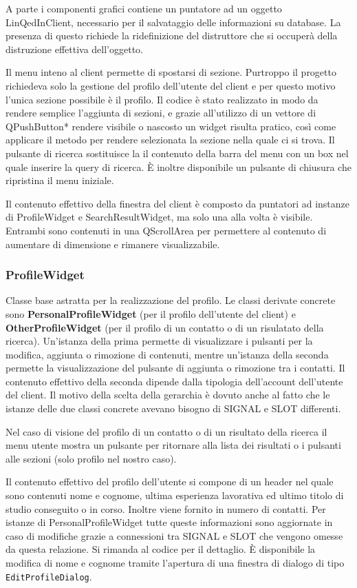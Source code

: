 \documentclass[a4paper,10pt]{article}
\begin{document}
A parte i componenti grafici contiene un puntatore ad un oggetto LinQedInClient, necessario per il salvataggio delle informazioni su database. La presenza di questo richiede la ridefinizione del distruttore che si occuperà della distruzione effettiva dell'oggetto.

Il menu inteno al client permette di spostarsi di sezione. Purtroppo il progetto richiedeva solo la gestione del profilo dell'utente del client e per questo motivo l'unica sezione possibile è il profilo. Il codice è stato realizzato in modo da rendere semplice l'aggiunta di sezioni, e grazie all'utilizzo di un vettore di QPushButton* rendere visibile o nascosto un widget risulta pratico, così come applicare il metodo per rendere selezionata la sezione nella quale ci si trova. Il pulsante di ricerca sostituisce la il contenuto della barra del menu con un box nel quale inserire la query di ricerca. È inoltre disponibile un pulsante di chiusura che ripristina il menu iniziale.

Il contenuto effettivo della finestra del client è composto da puntatori ad instanze di ProfileWidget e SearchResultWidget, ma solo una alla volta è visibile. Entrambi sono contenuti in una QScrollArea per permettere al contenuto di aumentare di dimensione e rimanere visualizzabile.

\subsubsection*{ProfileWidget}
Classe base astratta per la realizzazione del profilo. Le classi derivate concrete sono \textbf{PersonalProfileWidget} (per il profilo dell'utente del client) e \textbf{OtherProfileWidget} (per il profilo di un contatto o di un risulatato della ricerca). Un'istanza della prima permette di visualizzare i pulsanti per la modifica, aggiunta o rimozione di contenuti, mentre un'istanza della seconda permette la visualizzazione del pulsante di aggiunta o rimozione tra i contatti. Il contenuto effettivo della seconda dipende dalla tipologia dell'account dell'utente del client. Il motivo della scelta della gerarchia è dovuto anche al fatto che le istanze delle due classi concrete avevano bisogno di SIGNAL e SLOT differenti.

Nel caso di visione del profilo di un contatto o di un risultato della ricerca il menu utente mostra un pulsante per ritornare alla lista dei risultati o i pulsanti alle sezioni (solo profilo nel nostro caso).

Il contenuto effettivo del profilo dell'utente si compone di un header nel quale sono contenuti nome e cognome, ultima esperienza lavorativa ed ultimo titolo di studio conseguito o in corso. Inoltre viene fornito in numero di contatti. Per istanze di PersonalProfileWidget tutte queste informazioni sono aggiornate in caso di modifiche grazie a connessioni tra SIGNAL e SLOT che vengono omesse da questa relazione. Si rimanda al codice per il dettaglio. È disponibile la modifica di nome e cognome tramite l'apertura di una finestra di dialogo di tipo \texttt{EditProfileDialog}.
\end{document}
